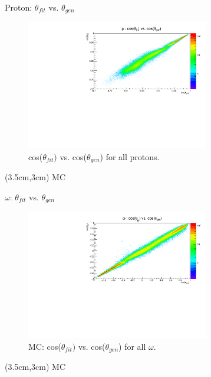 \documentclass[
		10pt
		]{beamer}
\begin{document}
\begin{frame}{Proton: $\theta_{fit}$ vs. $\theta_{gen}$}
	\begin{figure}
		\includegraphics[width=8cm]{Plots/MC/1/ThetaTheta1Proton.pdf}
		\captionsetup{labelformat=empty}
		\caption{cos($\theta_{fit})$ vs. cos($\theta_{gen}$) for all protons.}
	\end{figure}

\begin{textblock*}{4.5cm}(3.5cm,3cm)
	MC
\end{textblock*}



\end{frame}

\begin{frame} {$\omega$: $\theta_{fit}$ vs. $\theta_{gen}$}

\begin{figure}
	
	\includegraphics[width=8cm]{Plots/MC/1/ThetaTheta1Omega.pdf}
	\captionsetup{labelformat=empty}
	\caption{MC: cos($\theta_{fit})$ vs. cos($\theta_{gen}$) for all $\omega$.}
	
\end{figure}

\begin{textblock*}{4.5cm}(3.5cm,3cm)
	MC
\end{textblock*}

\end{frame}
\end{document}
